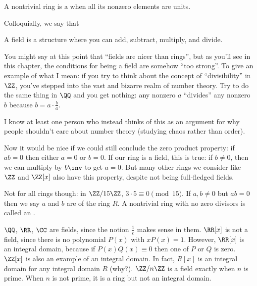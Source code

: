 \begin{definition}
	A nontrivial ring is a 
	when all its nonzero elements are units.
\end{definition}

Colloquially, we say that
\begin{moral}
A field is a structure where you can add, subtract, multiply, and divide.
\end{moral}

\begin{remark}
	You might say at this point that ``fields are nicer than rings'',
	but as you'll see in this chapter, the conditions for
	being a field are somehow ``too strong''.
	To give an example of what I mean:
	if you try to think about the concept of ``divisibility''
	in $\ZZ$, you've stepped into the vast and bizarre realm of
	number theory.  Try to do the same thing in $\QQ$ and you get nothing:
	any nonzero $a$ ``divides'' any nonzero $b$
	because $b = a \cdot \frac ba$.

	I know at least one person who instead
	thinks of this as an argument for why people
	shouldn't care about number theory
	(studying chaos rather than order).
\end{remark}

Now it would be nice if we could still conclude the zero product property:
if $ab = 0$ then either $a = 0$ or $b = 0$.
If our ring is a field, this is true: if $b \neq 0$,
then we can multiply by $b\inv$ to get $a = 0$.
But many other rings we consider like $\ZZ$ and $\ZZ[x]$ also have this property,
despite not being full-fledged fields.

Not for all rings though: in $\ZZ/15\ZZ$, $3 \cdot 5 \equiv 0 \pmod{15}$.
If $a, b \neq 0$ but $ab=0$ then we say $a$ and $b$ are 
of the ring $R$.
A nontrivial ring with no zero divisors is called an .

\begin{example}
	\listhack
	\begin{enumerate}[(a)]
		\ii $\QQ$, $\RR$, $\CC$ are fields, since the notion $\frac 1c$ makes sense in them.
		\ii $\RR[x]$ is not a field, since there is no polynomial $P(x)$ with $xP(x) = 1$.
		However, $\RR[x]$ is an integral domain, because if $P(x) Q(x) \equiv 0$ then one
		of $P$ or $Q$ is zero.
		\ii $\ZZ[x]$ is also an example of an integral domain.
		In fact, $R[x]$ is an integral domain for any integral domain $R$ (why?).
		\ii $\ZZ/n\ZZ$ is a field exactly when $n$ is prime.
		When $n$ is not prime, it is a ring but not an integral domain.
	\end{enumerate}
\end{example}

